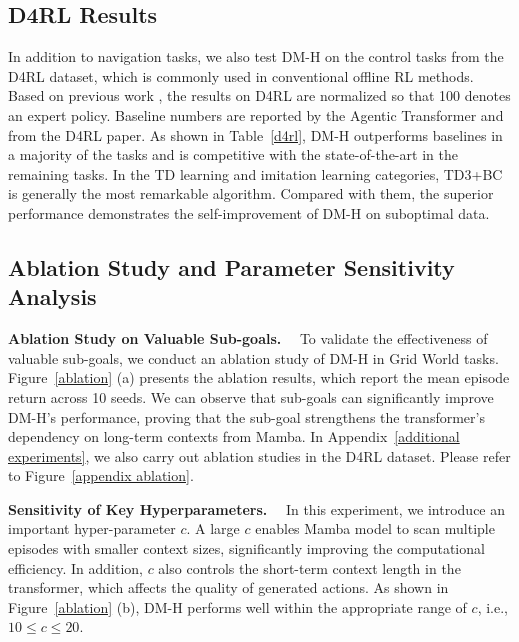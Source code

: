 \subsection{D4RL Results}
\label{D4RL Results}
In addition to navigation tasks, we also test DM-H on the control tasks from the D4RL dataset, which is commonly used in conventional offline RL methods. Based on previous work \cite{13}, the results on D4RL are normalized so that 100 denotes an expert policy. Baseline numbers are reported by the Agentic Transformer \cite{1} and from the D4RL paper. As shown in Table~\ref{d4rl}, DM-H outperforms baselines in a majority of the tasks and is competitive with the state-of-the-art in the remaining tasks. In the TD learning and imitation learning categories, TD3+BC is generally the most remarkable algorithm. Compared with them, the superior performance demonstrates the self-improvement of DM-H on suboptimal data.

\subsection{Ablation Study and Parameter Sensitivity Analysis}
\label{Ablation}
\noindent\textbf{Ablation Study on Valuable Sub-goals.}~~
To validate the effectiveness of valuable sub-goals, we conduct an ablation study of DM-H in Grid World tasks.
Figure~\ref{ablation} (a) presents the ablation results, which report the mean episode return across 10 seeds.
We can observe that sub-goals can significantly improve DM-H's performance, proving that the sub-goal strengthens the transformer's dependency on long-term contexts from Mamba. In Appendix~\ref{additional experiments}, we also carry out ablation studies in the D4RL dataset. Please refer to Figure~\ref{appendix ablation}.

\noindent\textbf{Sensitivity of Key Hyperparameters.}~~
In this experiment, we introduce an important hyper-parameter $c$. A large $c$ enables Mamba model to scan multiple episodes with smaller context sizes, significantly improving the computational efficiency. In addition, $c$ also controls the short-term context length in the transformer, which affects the quality of generated actions. As shown in Figure~\ref{ablation} (b), DM-H performs well within the appropriate range of $c$, i.e., $10\leq c \leq 20$.


